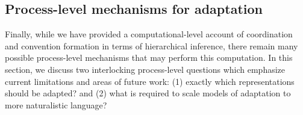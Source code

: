 


\subsection{Process-level mechanisms for adaptation}

Finally, while we have provided a computational-level account of coordination and convention formation in terms of hierarchical inference, there remain many possible process-level mechanisms that may perform this computation.
In this section, we discuss two interlocking process-level questions which emphasize current limitations and areas of future work: (1) exactly which representations should be adapted? and (2) what is required to scale models of adaptation to more naturalistic language? 


